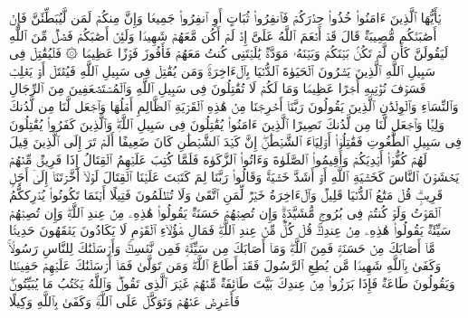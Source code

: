 \startbuffer[\q:4:71]
یَٰۤأَیُّهَا ٱلَّذِینَ ءَامَنُوا۟ خُذُوا۟ حِذۡرَكُمۡ فَٱنفِرُوا۟ ثُبَاتٍ أَوِ ٱنفِرُوا۟ جَمِیعࣰا%
\stopbuffer%
\startbuffer[\q:4:72]
وَإِنَّ مِنكُمۡ لَمَن لَّیُبَطِّئَنَّ فَإِنۡ أَصَٰبَتۡكُم مُّصِیبَةࣱ قَالَ قَدۡ أَنۡعَمَ ٱللَّهُ عَلَیَّ إِذۡ لَمۡ أَكُن مَّعَهُمۡ شَهِیدࣰا%
\stopbuffer%
\startbuffer[\q:4:73]
وَلَئِنۡ أَصَٰبَكُمۡ فَضۡلࣱ مِّنَ ٱللَّهِ لَیَقُولَنَّ كَأَن لَّمۡ تَكُنۢ بَیۡنَكُمۡ وَبَیۡنَهُۥ مَوَدَّةࣱ یَٰلَیۡتَنِی كُنتُ مَعَهُمۡ فَأَفُوزَ فَوۡزًا عَظِیمࣰا%
\stopbuffer%
\startbuffer[\q:4:74]
۞ فَلۡیُقَٰتِلۡ فِی سَبِیلِ ٱللَّهِ ٱلَّذِینَ یَشۡرُونَ ٱلۡحَیَوٰةَ ٱلدُّنۡیَا بِٱلۡءَاخِرَةِۚ وَمَن یُقَٰتِلۡ فِی سَبِیلِ ٱللَّهِ فَیُقۡتَلۡ أَوۡ یَغۡلِبۡ فَسَوۡفَ نُؤۡتِیهِ أَجۡرًا عَظِیمࣰا%
\stopbuffer%
\startbuffer[\q:4:75]
وَمَا لَكُمۡ لَا تُقَٰتِلُونَ فِی سَبِیلِ ٱللَّهِ وَٱلۡمُسۡتَضۡعَفِینَ مِنَ ٱلرِّجَالِ وَٱلنِّسَاۤءِ وَٱلۡوِلۡدَٰنِ ٱلَّذِینَ یَقُولُونَ رَبَّنَاۤ أَخۡرِجۡنَا مِنۡ هَٰذِهِ ٱلۡقَرۡیَةِ ٱلظَّالِمِ أَهۡلُهَا وَٱجۡعَل لَّنَا مِن لَّدُنكَ وَلِیࣰّا وَٱجۡعَل لَّنَا مِن لَّدُنكَ نَصِیرًا%
\stopbuffer%
\startbuffer[\q:4:76]
ٱلَّذِینَ ءَامَنُوا۟ یُقَٰتِلُونَ فِی سَبِیلِ ٱللَّهِۖ وَٱلَّذِینَ كَفَرُوا۟ یُقَٰتِلُونَ فِی سَبِیلِ ٱلطَّٰغُوتِ فَقَٰتِلُوۤا۟ أَوۡلِیَاۤءَ ٱلشَّیۡطَٰنِۖ إِنَّ كَیۡدَ ٱلشَّیۡطَٰنِ كَانَ ضَعِیفًا%
\stopbuffer%
\startbuffer[\q:4:77]
أَلَمۡ تَرَ إِلَى ٱلَّذِینَ قِیلَ لَهُمۡ كُفُّوۤا۟ أَیۡدِیَكُمۡ وَأَقِیمُوا۟ ٱلصَّلَوٰةَ وَءَاتُوا۟ ٱلزَّكَوٰةَ فَلَمَّا كُتِبَ عَلَیۡهِمُ ٱلۡقِتَالُ إِذَا فَرِیقࣱ مِّنۡهُمۡ یَخۡشَوۡنَ ٱلنَّاسَ كَخَشۡیَةِ ٱللَّهِ أَوۡ أَشَدَّ خَشۡیَةࣰۚ وَقَالُوا۟ رَبَّنَا لِمَ كَتَبۡتَ عَلَیۡنَا ٱلۡقِتَالَ لَوۡلَاۤ أَخَّرۡتَنَاۤ إِلَىٰۤ أَجَلࣲ قَرِیبࣲۗ قُلۡ مَتَٰعُ ٱلدُّنۡیَا قَلِیلࣱ وَٱلۡءَاخِرَةُ خَیۡرࣱ لِّمَنِ ٱتَّقَىٰ وَلَا تُظۡلَمُونَ فَتِیلًا%
\stopbuffer%
\startbuffer[\q:4:78]
أَیۡنَمَا تَكُونُوا۟ یُدۡرِككُّمُ ٱلۡمَوۡتُ وَلَوۡ كُنتُمۡ فِی بُرُوجࣲ مُّشَیَّدَةࣲۗ وَإِن تُصِبۡهُمۡ حَسَنَةࣱ یَقُولُوا۟ هَٰذِهِۦ مِنۡ عِندِ ٱللَّهِۖ وَإِن تُصِبۡهُمۡ سَیِّئَةࣱ یَقُولُوا۟ هَٰذِهِۦ مِنۡ عِندِكَۚ قُلۡ كُلࣱّ مِّنۡ عِندِ ٱللَّهِۖ فَمَالِ هَٰۤؤُلَاۤءِ ٱلۡقَوۡمِ لَا یَكَادُونَ یَفۡقَهُونَ حَدِیثࣰا%
\stopbuffer%
\startbuffer[\q:4:79]
مَّاۤ أَصَابَكَ مِنۡ حَسَنَةࣲ فَمِنَ ٱللَّهِۖ وَمَاۤ أَصَابَكَ مِن سَیِّئَةࣲ فَمِن نَّفۡسِكَۚ وَأَرۡسَلۡنَٰكَ لِلنَّاسِ رَسُولࣰاۚ وَكَفَىٰ بِٱللَّهِ شَهِیدࣰا%
\stopbuffer%
\startbuffer[\q:4:80]
مَّن یُطِعِ ٱلرَّسُولَ فَقَدۡ أَطَاعَ ٱللَّهَۖ وَمَن تَوَلَّىٰ فَمَاۤ أَرۡسَلۡنَٰكَ عَلَیۡهِمۡ حَفِیظࣰا%
\stopbuffer%
\startbuffer[\q:4:81]
وَیَقُولُونَ طَاعَةࣱ فَإِذَا بَرَزُوا۟ مِنۡ عِندِكَ بَیَّتَ طَاۤئِفَةࣱ مِّنۡهُمۡ غَیۡرَ ٱلَّذِی تَقُولُۖ وَٱللَّهُ یَكۡتُبُ مَا یُبَیِّتُونَۖ فَأَعۡرِضۡ عَنۡهُمۡ وَتَوَكَّلۡ عَلَى ٱللَّهِۚ وَكَفَىٰ بِٱللَّهِ وَكِیلًا%
